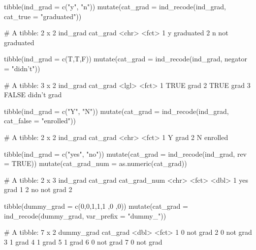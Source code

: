 \begin{Schunk}
\begin{Sinput}
tibble(ind_grad = c("y", "n")) %
  mutate(cat_grad  = ind_recode(ind_grad, 
                                cat_true = "graduated"))
\end{Sinput}
\begin{Soutput}
     # A tibble: 2 x 2
       ind_grad cat_grad     
       <chr>    <fct>        
     1 y        graduated    
     2 n        not graduated
\end{Soutput}
\end{Schunk}

\begin{Schunk}
\begin{Sinput}
tibble(ind_grad = c(T,T,F)) %
  mutate(cat_grad  = ind_recode(ind_grad, negator = "didn't"))
\end{Sinput}
\begin{Soutput}
     # A tibble: 3 x 2
       ind_grad cat_grad   
       <lgl>    <fct>      
     1 TRUE     grad       
     2 TRUE     grad       
     3 FALSE    didn't grad
\end{Soutput}
\end{Schunk}

\begin{Schunk}
\begin{Sinput}
tibble(ind_grad = c("Y", "N")) %
  mutate(cat_grad  = ind_recode(ind_grad, cat_false = "enrolled"))
\end{Sinput}
\begin{Soutput}
     # A tibble: 2 x 2
       ind_grad cat_grad
       <chr>    <fct>   
     1 Y        grad    
     2 N        enrolled
\end{Soutput}
\end{Schunk}

\begin{Schunk}
\begin{Sinput}
tibble(ind_grad = c("yes", "no")) %
  mutate(cat_grad  = ind_recode(ind_grad, rev = TRUE)) %
  mutate(cat_grad_num = as.numeric(cat_grad))
\end{Sinput}
\begin{Soutput}
     # A tibble: 2 x 3
       ind_grad cat_grad cat_grad_num
       <chr>    <fct>           <dbl>
     1 yes      grad                1
     2 no       not grad            2
\end{Soutput}
\end{Schunk}

\begin{Schunk}
\begin{Sinput}
tibble(dummy_grad = c(0,0,1,1,1 ,0 ,0)) %
  mutate(cat_grad  = ind_recode(dummy_grad, var_prefix = "dummy_"))
\end{Sinput}
\begin{Soutput}
     # A tibble: 7 x 2
       dummy_grad cat_grad
            <dbl> <fct>   
     1          0 not grad
     2          0 not grad
     3          1 grad    
     4          1 grad    
     5          1 grad    
     6          0 not grad
     7          0 not grad
\end{Soutput}
\end{Schunk}

